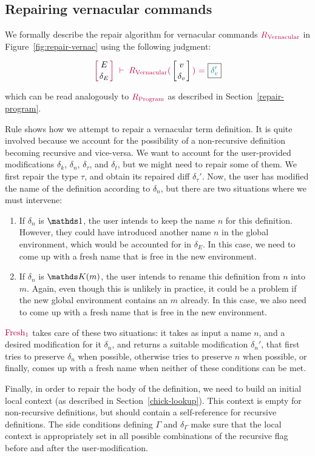 \subsection{Repairing vernacular commands} \label{repair-vernacular}

We formally describe the repair algorithm for vernacular commands
$\textcolor{purple}{R_{\text{Vernacular}}}$ in Figure~\ref{fig:repair-vernac} using the following
judgment:

{
  \[
    {\turnstile
      {\denv{E}{\delta_E}}
      {\repairVernac{v}{\delta_v}{\delta_v'}}
    }
  \]
}

\noindent which can be read analogously to $\textcolor{purple}{R_{\text{Program}}}$ as described in
Section~\ref{repair-program}.



Rule  shows how we attempt to repair a vernacular
term definition.  It is quite involved because we account for the possibility of
a non-recursive definition becoming recursive and vice-versa.  We want to
account for the user-provided modifications $\delta_k$, $\delta_n$,
$\delta_\tau$, and $\delta_t$, but we might need to repair some of them.  We
first repair the type $\tau$, and obtain its repaired diff $\delta_\tau'$.  Now,
the user has modified the name of the definition according to $\delta_n$, but
there are two situations where we must intervene:

\begin{enumerate}

\item If $\delta_n$ is $\MathSame$, the user intends to keep the name $n$ for
this definition.  However, they could have introduced another name $n$ in the
global environment, which would be accounted for in $\delta_E$.  In this case,
we need to come up with a fresh name that is free in the new environment.

\item If $\delta_n$ is $\MathReplace{m}$, the user intends to rename this
definition from $n$ into $m$.  Again, even though this is unlikely in practice,
it could be a problem if the new global environment contains an $m$ already.  In
this case, we also need to come up with a fresh name that is free in the new
environment.

\end{enumerate}

\noindent $\textcolor{purple}{\text{Fresh}_1}$ takes care of these two situations: it takes as input a
name $n$, and a desired modification for it $\delta_n$, and returns a suitable
modification $\delta_n'$, that first tries to preserve $\delta_n$ when possible,
otherwise tries to preserve $n$ when possible, or finally, comes up with a fresh
name when neither of these conditions can be met.

Finally, in order to repair the body of the definition, we need to build an
initial local context (as described in Section~\ref{chick-lookup}).  This
context is empty for non-recursive definitions, but should contain a
self-reference for recursive definitions.  The side conditions defining $\Gamma$
and $\delta_\Gamma$ make sure that the local context is appropriately set in all
possible combinations of the recursive flag before and after the
user-modification.
